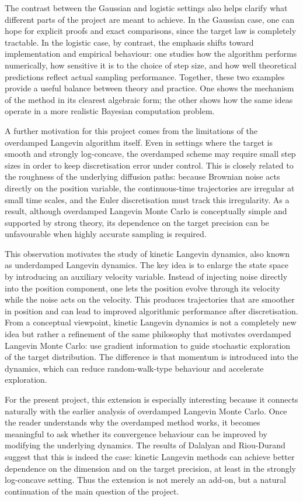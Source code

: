 \documentclass[a4paper,11pt, titlepage]{article}
\theoremstyle{definition}
\theoremstyle{plain}
\theoremstyle{remark}
\begin{document}
The contrast between the Gaussian and logistic settings also helps clarify what different parts of the project are meant to achieve. In the Gaussian case, one can hope for explicit proofs and exact comparisons, since the target law is completely tractable. In the logistic case, by contrast, the emphasis shifts toward implementation and empirical behaviour: one studies how the algorithm performs numerically, how sensitive it is to the choice of step size, and how well theoretical predictions reflect actual sampling performance. Together, these two examples provide a useful balance between theory and practice. One shows the mechanism of the method in its clearest algebraic form; the other shows how the same ideas operate in a more realistic Bayesian computation problem.

A further motivation for this project comes from the limitations of the overdamped Langevin algorithm itself. Even in settings where the target is smooth and strongly log-concave, the overdamped scheme may require small step sizes in order to keep discretisation error under control. This is closely related to the roughness of the underlying diffusion paths: because Brownian noise acts directly on the position variable, the continuous-time trajectories are irregular at small time scales, and the Euler discretisation must track this irregularity. As a result, although overdamped Langevin Monte Carlo is conceptually simple and supported by strong theory, its dependence on the target precision can be unfavourable when highly accurate sampling is required.

This observation motivates the study of kinetic Langevin dynamics, also known as underdamped Langevin dynamics. The key idea is to enlarge the state space by introducing an auxiliary velocity variable. Instead of injecting noise directly into the position component, one lets the position evolve through its velocity while the noise acts on the velocity. This produces trajectories that are smoother in position and can lead to improved algorithmic performance after discretisation. From a conceptual viewpoint, kinetic Langevin dynamics is not a completely new idea but rather a refinement of the same philosophy that motivates overdamped Langevin Monte Carlo: use gradient information to guide stochastic exploration of the target distribution. The difference is that momentum is introduced into the dynamics, which can reduce random-walk-type behaviour and accelerate exploration.

For the present project, this extension is especially interesting because it connects naturally with the earlier analysis of overdamped Langevin Monte Carlo. Once the reader understands why the overdamped method works, it becomes meaningful to ask whether its convergence behaviour can be improved by modifying the underlying dynamics. The results of Dalalyan and Riou-Durand suggest that this is indeed the case: kinetic Langevin methods can achieve better dependence on the dimension and on the target precision, at least in the strongly log-concave setting. Thus the extension is not merely an add-on, but a natural continuation of the main question of the project.
\end{document}
